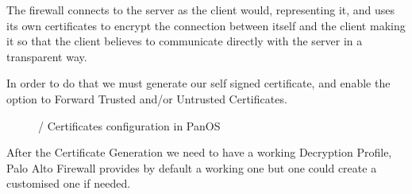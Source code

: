 The firewall connects to the server as the client would, representing it, and uses its own certificates to encrypt the connection between itself and the client making it so that the client believes to communicate directly with the server in a transparent way.

In order to do that we must generate our self signed certificate, and enable the option to Forward Trusted and/or Untrusted Certificates.

\begin{figure}[!hb]
\centering
 \hspace{0.5cm}
 \caption{/ Certificates configuration in PanOS}\label{Certificates}
\end{figure}

\newpage

After the Certificate Generation we need to have a working Decryption Profile, Palo Alto Firewall provides by default a working one but one could create a customised one if needed.

